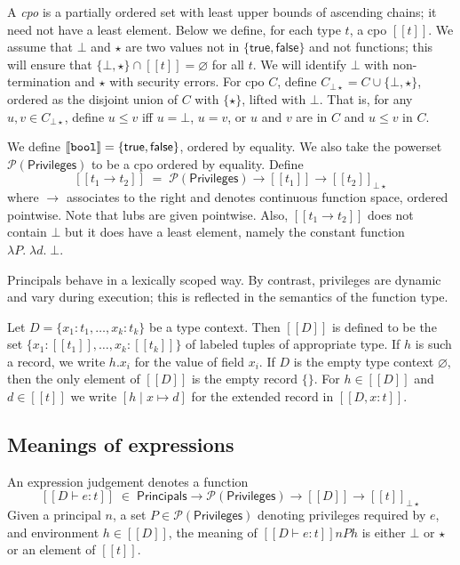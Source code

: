\documentclass[submission,copyright,creativecommons]{eptcs}
\newcommand{\BOOL}{\mbox{\texttt{bool}}}
\renewcommand{\P}{\mathcal{P}}
\newcommand{\ldb}{[\![}
\newcommand{\rdb}{]\!]}
\newcommand{\means}[1]{\ldb {#1}\rdb}
\newcommand{\union}{\cup}
\newcommand{\proves}{\vdash}
\newcommand{\ext}[3]{[#1\mid#2\!\mapsto\!#3]}
\newcommand{\lam}[2]{\lambda #1.\; #2} \newcommand{\all}[2]{\forall #1.\; #2}
\newcommand{\Empty}{\varnothing}
\newcommand{\PRINC}{{\mathsf{Principals}}}
\newcommand{\PRIV}{{\mathsf{Privileges}}}
\newcommand{\D}{D} \newcommand{\ty}{t} \renewcommand{\th}{\theta}
\newcommand{\n}{n} \newcommand{\p}{p} \newcommand{\Ps}{\Pi} \newcommand{\h}{h}
\begin{document}
A \emph{cpo} is a partially ordered set with least upper bounds of
ascending chains; it need not have a least element. 
Below we define, for each type $\ty$, a cpo $\means{\ty}$.
We assume that $\bot$ and $\star$ are two values not in 
$\{ \mathsf{true},  \mathsf{false}\}$ and not functions; this will ensure that 
$\{ \bot,\star\} \cap \means{\ty}=\Empty$ for all $\ty$. We will identify
$\bot$ with non-termination and $\star$ with security errors.
For cpo $C$, define $C_{\bot\star}=C\union\{\bot,\star\}$,  
ordered as the disjoint union of $C$ with $\{\star\}$, lifted with $\bot$.  
That is, for any $u,v\in C_{\bot\star}$, define
$u\leq v$ iff $u=\bot$, $u=v$, or $u$ and $v$ are in $C$ and $u\leq v$ in $C$.

We define $\means{\BOOL} = \{\mathsf{true}, \mathsf{false}\}$,
ordered by equality. We also take the powerset $\P(\PRIV)$ to be a cpo ordered by 
equality.  
Define \[ \means{\ty_1\to\ty_2}  \;  =  \;  \P(\PRIV)\to\means{\ty_1}\to
\means{\ty_2}_{\bot\star}\] where $\to$ associates to the right and 
denotes continuous function space, ordered pointwise.  Note that lubs are 
given pointwise. Also, $\means{\ty_1\to\ty_2}$ does not contain $\bot$ but it 
does have a least element, namely the constant function 
$\lam{P}{\lam{d}{\bot}}$.

Principals behave in a lexically scoped way.  By contrast, privileges are
dynamic and vary during execution; this is reflected in the semantics of the function
type.  

Let $\D=\{x_1:\ty_1,\ldots,x_k:\ty_k\}$ be a type context. Then
$\means{\D}$ is defined to be the set
$\{x_1:\means{\ty_1},\ldots,x_k:\means{\ty_k}\}$ of labeled tuples of
appropriate type.  If $\h$ is such a record, we write $\h.x_i$ for the
value of field $x_i$.  If $\D$ is the empty type context $\Empty$,
then the only element of $\means{\D}$ is the empty record $\{\}$.  For
$\h\in\means{D}$ and $d\in\means{\ty}$ we write $\ext{\h}{x}{d}$ for the
extended record in $\means{D,x:\ty}$.

\subsection{Meanings of expressions}\label{sec:mexpr}

An expression judgement denotes a function
\[
\means{\D\proves e:\ty} \; \in \; \PRINC\to\P(\PRIV)\to\means{\D}\to\means{\ty}_{\bot\star}
\]
Given a principal $\n$, a set $P\in\P(\PRIV)$ denoting privileges required
by $e$, and environment $\h\in\means{\D}$, the meaning of $\means{\D\proves e:\ty}\n P \h$
is either $\bot$ or $\star$ or an element of $\means{\ty}$.
\end{document}
